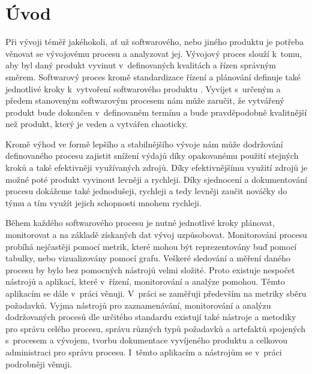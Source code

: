 \documentclass[czech,master]{diploma}
\begin{document}
\MakeTitlePages


\lstlistoflistings

\chapter{Úvod}
\label{sec:Introduction}

Při vývoji téměř jakéhokoli, ať už softwarového, nebo jiného produktu je potřeba věnovat se vývojovému procesu a analyzovat jej. Vývojový proces slouží k~tomu, aby byl daný produkt vyvinut v~definovaných kvalitách a řízen správným směrem. Softwarový proces kromě standardizace řízení a plánování definuje také jednotlivé kroky k~vytvoření softwarového produktu \cite{ref:sommerrville_sw_process}. Vyvíjet s~určeným a předem stanoveným softwarovým procesem nám může zaručit, že vytvářený produkt bude dokončen v~definovaném termínu a bude pravděpodobně kvalitnější než produkt, který je veden a vytvářen chaoticky.

Kromě výhod ve formě lepšího a stabilnějšího vývoje nám může dodržování definovaného procesu zajistit snížení výdajů díky opakovanému použití stejných kroků a také efektivněji využívaných zdrojů. Díky efektivnějšímu využití zdrojů je možné poté produkt vyvinout levněji a rychleji. Díky sjednocení a dokumentování procesu dokážeme také jednodušeji, rychleji a tedy levněji zaučit nováčky do týmu a tím využít jejich schopnosti mnohem rychleji.

Během každého softwarového procesu je nutné jednotlivé kroky plánovat, monitorovat a na základě získaných dat vývoj uzpůsobovat. Monitorování procesu probíhá nejčastěji pomocí metrik, které mohou být reprezentovány buď pomocí tabulky, nebo vizualizovány pomocí grafu. Veškeré sledování a měření daného procesu by bylo bez pomocných nástrojů velmi složité. Proto existuje nespočet nástrojů a aplikací, které v~řízení, monitorování a analýze pomohou. Těmto aplikacím se dále v~práci věnuji. V~práci se zaměřuji především na metriky sběru požadavků. Vyjma nástrojů pro zaznamenávání, monitorování a analýzu dodržovaných procesů dle určitého standardu existují také nástroje a metodiky pro správu celého procesu, správu různých typů požadavků a artefaktů spojených s~procesem a vývojem, tvorbu dokumentace vyvíjeného produktu a celkovou administraci pro správu procesu. I~těmto aplikacím a nástrojům se v~práci podrobněji věnuji. 
\end{document}
